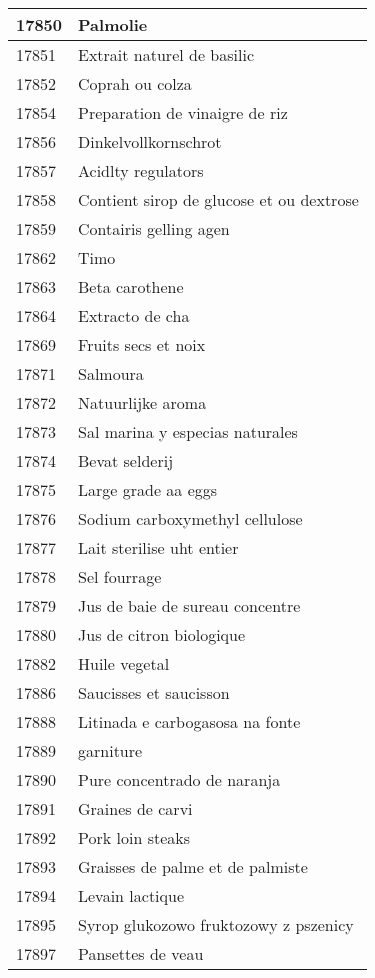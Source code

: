 \begin{longtable}{|l|l|}
17850 & Palmolie \\ \hline 
17851 & Extrait naturel de basilic \\ \hline 
17852 & Coprah ou colza \\ \hline 
17854 & Preparation de vinaigre de riz \\ \hline 
17856 & Dinkelvollkornschrot \\ \hline 
17857 & Acidlty regulators \\ \hline 
17858 & Contient sirop de glucose et ou dextrose \\ \hline 
17859 & Contairis gelling agen \\ \hline 
17862 & Timo \\ \hline 
17863 & Beta carothene \\ \hline 
17864 & Extracto de cha \\ \hline 
17869 & Fruits secs et noix \\ \hline 
17871 & Salmoura \\ \hline 
17872 & Natuurlijke aroma \\ \hline 
17873 & Sal marina y especias naturales \\ \hline 
17874 & Bevat selderij \\ \hline 
17875 & Large grade aa eggs \\ \hline 
17876 & Sodium carboxymethyl cellulose \\ \hline 
17877 & Lait sterilise uht entier \\ \hline 
17878 & Sel fourrage \\ \hline 
17879 & Jus de baie de sureau concentre \\ \hline 
17880 & Jus de citron  biologique \\ \hline 
17882 & Huile vegetal \\ \hline 
17886 & Saucisses et saucisson \\ \hline 
17888 & Litinada e carbogasosa na fonte \\ \hline 
17889 & garniture \\ \hline 
17890 & Pure concentrado de naranja \\ \hline 
17891 & Graines de carvi \\ \hline 
17892 & Pork loin steaks \\ \hline 
17893 & Graisses de palme et de palmiste \\ \hline 
17894 & Levain lactique \\ \hline 
17895 & Syrop glukozowo fruktozowy z pszenicy \\ \hline 
17897 & Pansettes de veau \\ \hline 

\end{longtable}
